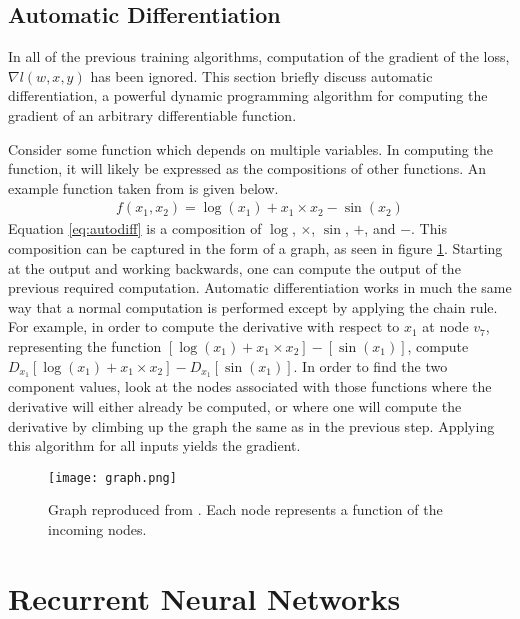 \subsection{Automatic Differentiation}\label{sec:autodiff}
In all of the previous training algorithms, computation of the gradient of the loss, $\nabla l(w,x,y)$ has been ignored.  This section briefly discuss automatic differentiation, a powerful dynamic programming algorithm for computing the gradient of an arbitrary differentiable function.

Consider some function which depends on multiple variables.  In computing the function, it will likely be expressed as the compositions of other functions.  An example function taken from \cite{ab15} is given below.
\begin{align}\label{eq:autodiff}
f(x_1,x_2) = \log(x_1) + x_1\times x_2 - \sin(x_2)
\end{align}
Equation \ref{eq:autodiff} is a composition of $\log$, $\times$, $\sin$, $+$, and $-$.  This composition can be captured in the form of a graph, as seen in figure \ref{fig:graph}.  Starting at the output and working backwards, one can compute the output of the previous required computation.  Automatic differentiation works in much the same way that a normal computation is performed except by applying the chain rule.  For example, in order to compute the derivative with respect to $x_1$ at node $v_7$, representing the function $[\log(x_1) + x_1\times x_2] - [\sin(x_1)]$, compute $D_{x_1}[\log(x_1) + x_1\times x_2] - D_{x_1}[\sin(x_1)]$.  In order to find the two component values, look at the nodes associated with those functions where the derivative will either already be computed, or where one will compute the derivative by climbing up the graph the same as in the previous step.  Applying this algorithm for all inputs yields the gradient.

\begin{figure}
    \centering
    \texttt{[image: graph.png]}
    \caption{Graph reproduced from \cite{ab15}.  Each node represents a function of the incoming nodes.}
    \label{fig:graph}
\end{figure}

\section{Recurrent Neural Networks}\label{sec:rnn}

